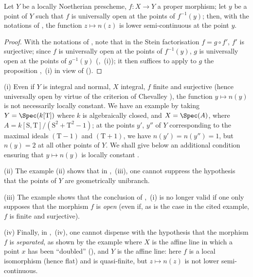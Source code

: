 \begin{corollary}[15.5.4]
\label{IV.15.5.4}
Let $Y$ be a locally Noetherian prescheme, $f:X\to Y$ a proper morphism; let $y$ be a point of $Y$ such that $f$ is universally open at the points of $f^{-1}(y)$;
then, with the notations of , the function $z\mapsto n(z)$ is lower semi-continuous at the point $y$.
\end{corollary}

\begin{proof}
With the notations of , note that in the Stein factorisation $f=g\circ f'$, $f'$ is surjective; since $f$ is universally open at the points of $f^{-1}(y)$, $g$ is universally open at the points of $g^{-1}(y)$ (,~(i)); it then suffices to apply to $g$ the proposition ,~(i) in view of ().
\end{proof}

\begin{remarks}[15.5.5]
\label{IV.15.5.5}
(i)
Even if $Y$ is integral and normal, $X$ integral, $f$ finite and surjective (hence universally open by virtue of the criterion of Chevalley ), the function $y\mapsto n(y)$ is not necessarily locally constant.
We have an example by taking $Y=\Spec(k[\mathrm{T}])$ where $k$ is algebraically closed, and $X=\Spec(A)$, where $A=k[\mathrm{S},\mathrm{T}]/(\mathrm{S}^2+\mathrm{T}^2-1)$; at the points $y'$, $y''$ of $Y$ corresponding to the maximal ideals $(\mathrm{T}-1)$ and $(\mathrm{T}+1)$, we have $n(y')=n(y'')=1$, but $n(y)=2$ at all other points of $Y$.
We shall give below an additional condition ensuring that $y\mapsto n(y)$ is locally constant .

(ii)
The example  (ii) shows that in ,~(iii), one cannot suppress the hypothesis that the points of $Y$ are geometrically unibranch.

(iii)
The example  shows that the conclusion of ,~(i) is no longer valid if one only supposes that the morphism $f$ is \emph{open} (even if, as is the case in the cited example, $f$ is finite and surjective).

(iv)
Finally, in ,~(iv), one cannot dispense with the hypothesis that the morphism $f$ is \emph{separated}, as shown by the example where $X$ is the affine line in which a point $x$ has been ``doubled'' (), and $Y$ is the affine line: here $f$ is a local isomorphism (hence flat) and is quasi-finite, but $z\mapsto n(z)$ is not lower semi-continuous.
\end{remarks}

